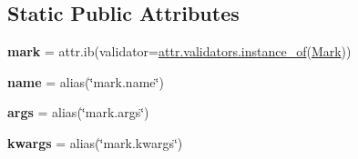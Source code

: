 \subsection*{Static Public Attributes}
\begin{DoxyCompactItemize}
\item 
\mbox{\label{class__pytest_1_1mark_1_1structures_1_1_mark_decorator_a0da28d8c40d52488fe2d218f42290975}} 
{\bfseries mark} = attr.\+ib(validator=\hyperlink{namespaceattr_1_1validators_afb2ed7b7c580c1c23a2614e689c6b8ca}{attr.\+validators.\+instance\+\_\+of}(\hyperlink{class__pytest_1_1mark_1_1structures_1_1_mark}{Mark}))
\item 
\mbox{\label{class__pytest_1_1mark_1_1structures_1_1_mark_decorator_a830dd45bbcebea867440c66c46c8fcea}} 
{\bfseries name} = alias(\char`\"{}mark.\+name\char`\"{})
\item 
\mbox{\label{class__pytest_1_1mark_1_1structures_1_1_mark_decorator_ae2a3509baaf2ab6369478c6a759da1bc}} 
{\bfseries args} = alias(\char`\"{}mark.\+args\char`\"{})
\item 
\mbox{\label{class__pytest_1_1mark_1_1structures_1_1_mark_decorator_a96426a015360f3d1bc8e357157d2eeff}} 
{\bfseries kwargs} = alias(\char`\"{}mark.\+kwargs\char`\"{})
\end{DoxyCompactItemize}


